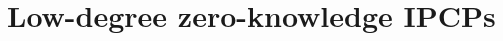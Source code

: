 \documentclass[english,12pt]{reedthesis}
\theoremstyle{plain}
\newtheorem{lemma}[lemma]{Lemma}
\theoremstyle{definition}
\theoremstyle{remark}
\newcommand{\TODO}[1]{\textcolor{red}{TODO: #1}}
\begin{document}







\chapter{Low-degree zero-knowledge IPCPs}\label{chap:ipcp-zero-knowledge}
\end{document}
